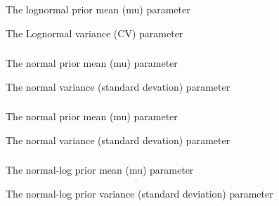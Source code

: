  {The lognormal prior mean (mu) parameter}

 {The Lognormal variance (CV) parameter}

\subsubsection[Normal]{}

 {The normal prior mean (mu) parameter}

 {The normal variance (standard devation) parameter}

\subsubsection[Normal By Stdev]{}

 {The normal prior mean (mu) parameter}

 {The normal variance (standard devation) parameter}

\subsubsection[Normal Log]{}

 {The normal-log prior mean (mu) parameter}

 {The normal-log prior variance (standard deviation) parameter}

\subsubsection[Uniform]{}

\subsubsection[Uniform Log]{}

